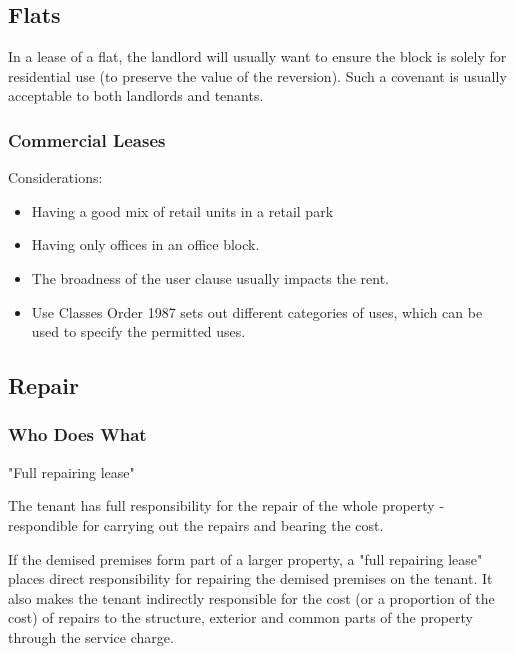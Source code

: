 \documentclass[
]{article}
\providecommand{\tightlist}{%
  \setlength{\itemsep}{0pt}\setlength{\parskip}{0pt}}
\newenvironment{env-ab392b14-a05f-4d9a-80eb-a63d00eb59ea}
{
    \savenotes\tcolorbox[blanker,breakable,left=5pt,borderline west={2pt}{-4pt}{gold}]
}
{
    \endtcolorbox\spewnotes
}
\begin{document}
\hypertarget{flats}{%
\subsection{Flats}\label{flats}}

In a lease of a flat, the landlord will usually want to ensure the block
is solely for residential use (to preserve the value of the reversion).
Such a covenant is usually acceptable to both landlords and tenants.

\hypertarget{commercial-leases}{%
\subsubsection{Commercial Leases}\label{commercial-leases}}

Considerations:

\begin{itemize}
\tightlist
\item
  Having a good mix of retail units in a retail park
\item
  Having only offices in an office block.
\item
  The broadness of the user clause usually impacts the rent.
\item
  Use Classes Order 1987 sets out different categories of uses, which
  can be used to specify the permitted uses.
\end{itemize}

\hypertarget{repair}{%
\subsection{Repair}\label{repair}}

\hypertarget{who-does-what}{%
\subsubsection{Who Does What}\label{who-does-what}}

\begin{env-ab392b14-a05f-4d9a-80eb-a63d00eb59ea}

"Full repairing lease"

The tenant has full responsibility for the repair of the whole property
- respondible for carrying out the repairs and bearing the cost.

\end{env-ab392b14-a05f-4d9a-80eb-a63d00eb59ea}

If the demised premises form part of a larger property, a "full
repairing lease" places direct responsibility for repairing the demised
premises on the tenant. It also makes the tenant indirectly responsible
for the cost (or a proportion of the cost) of repairs to the structure,
exterior and common parts of the property through the service charge.
\end{document}
